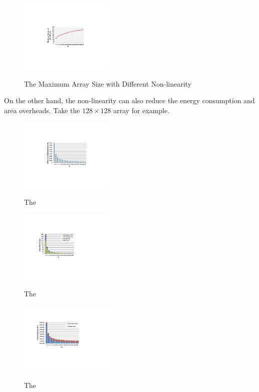 \begin{figure}%
\centering
  \includegraphics[width=0.4\textwidth]{./figures/non_linear}\\
  \caption{The Maximum Array Size with Different Non-linearity}\label{fig:non_linear}
\end{figure}

On the other hand, the non-linearity can also reduce the energy consumption and area overheads. Take the $128 \times 128$ array for example.


\begin{figure}%
\centering
  \includegraphics[width=0.4\textwidth]{./figures/non_linear_I.pdf}\\
  \caption{The}\label{fig:non_linear_I}
\end{figure}

\begin{figure}%
\centering
  \includegraphics[width=0.4\textwidth]{./figures/non_linear_energy.pdf}\\
  \caption{The}\label{fig:non_linear_energy}
\end{figure}

\begin{figure}%
\centering
  \includegraphics[width=0.4\textwidth]{./figures/non_linear_ara.pdf}\\
  \caption{The}\label{fig:non_linear_ara}
\end{figure}


